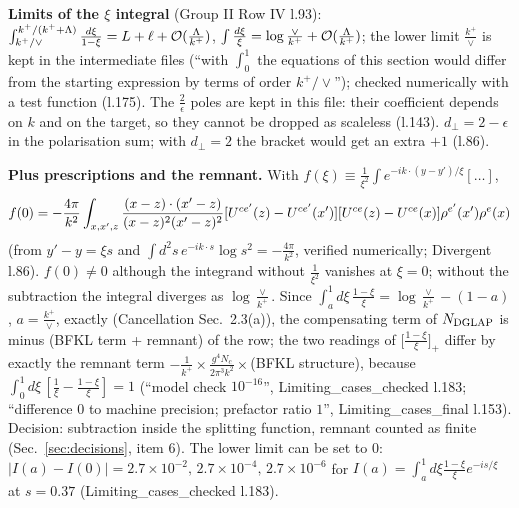 \documentclass[10pt]{article}
\begin{document}
\noindent\textbf{Limits of the $\xi$ integral} (Group II Row IV l.93): $\int_{k^{+}/\vee}^{k^{+}/(k^{+}+\Lambda)}\frac{d\xi}{1-\xi}=L+\ell+{\cal O}(\frac{\Lambda}{k^{+}})$, $\int\frac{d\xi}{\xi}=\log\frac{\vee}{k^{+}}+{\cal O}(\frac{\Lambda}{k^{+}})$; the lower limit $\frac{k^{+}}{\vee}$ is kept in the intermediate files (``with $\int_{0}^{1}$ the equations of this section would differ from the starting expression by terms of order $k^{+}/\vee$''); checked numerically with a test function (l.175). The $\frac{2}{\epsilon}$ poles are kept in this file: their coefficient depends on $k$ and on the target, so they cannot be dropped as scaleless (l.143). $d_{\perp}=2-\epsilon$ in the polarisation sum; with $d_{\perp}=2$ the bracket would get an extra $+1$ (l.86).

\noindent\textbf{Plus prescriptions and the remnant.} With $f(\xi)\equiv\frac{1}{\xi^{2}}\int e^{-ik\cdot(y-y')/\xi}[\dots]$,
\begin{align}
f(0)=-\frac{4\pi}{k^{2}}\int_{x,x',z}\frac{(x-z)\cdot(x'-z)}{(x-z)^{2}(x'-z)^{2}}[U^{ce'}(z)-U^{ce'}(x')][U^{ce}(z)-U^{ce}(x)]\rho^{e'}(x')\rho^{e}(x)\notag
\end{align}
(from $y'-y=\xi s$ and $\int d^{2}s\,e^{-ik\cdot s}\log s^{2}=-\frac{4\pi}{k^{2}}$, verified numerically; Divergent l.86). $f(0)\neq0$ although the integrand without $\frac{1}{\xi^{2}}$ vanishes at $\xi=0$; without the subtraction the integral diverges as $\log\frac{\vee}{k^{+}}$. Since $\int_{a}^{1}d\xi\,\frac{1-\xi}{\xi}=\log\frac{\vee}{k^{+}}-(1-a)$, $a=\frac{k^{+}}{\vee}$, exactly (Cancellation Sec.~2.3(a)), the compensating term of $N_{\rm DGLAP}$ is minus (BFKL term + remnant) of the row; the two readings of $\big[\frac{1-\xi}{\xi}\big]_{+}$ differ by exactly the remnant term $-\frac{1}{k^{+}}\times\frac{g^{4}N_{c}}{2\pi^{3}k^{2}}\times$(BFKL structure), because $\int_{0}^{1}d\xi\,[\frac1\xi-\frac{1-\xi}{\xi}]=1$ (``model check $10^{-16}$'', Limiting\_cases\_checked l.183; ``difference $0$ to machine precision; prefactor ratio $1$'', Limiting\_cases\_final l.153). Decision: subtraction inside the splitting function, remnant counted as finite (Sec.~\ref{sec:decisions}, item 6). The lower limit can be set to $0$: $|I(a)-I(0)|=2.7\times10^{-2},\,2.7\times10^{-4},\,2.7\times10^{-6}$ for $I(a)=\int_{a}^{1}d\xi\frac{1-\xi}{\xi}e^{-is/\xi}$ at $s=0.37$ (Limiting\_cases\_checked l.183).
\end{document}
